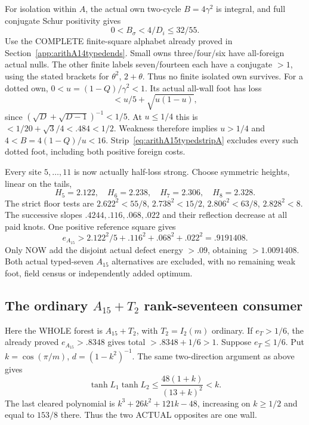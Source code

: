 \documentclass[11pt]{article}
\begin{document}
For isolation within \(A\), the actual
own two-cycle \(B=4\gamma^2\) is integral,
and full conjugate Schur positivity gives
\[
                         0<B_\sigma<4/D_i\le32/55 .
\]
Use the COMPLETE finite-square alphabet
already proved in
Section~\ref{app:arithA14typedends}.
Small owns three/four/six have all-foreign
actual nulls.
The other finite labels seven/fourteen
each have a conjugate \(>1\), using
the stated brackets for \(\theta^2\),
\(2+\theta\).
Thus no finite isolated own survives.
For a dotted own, \(0<u=(1-Q)/\gamma^2<1\).
Its actual all-wall foot has loss
\[
                  <u/5+\sqrt{u(1-u)},
\]
since \((\sqrt D+\sqrt{D-1})^{-1}<1/5\).
At \(u\le1/4\) this is
\(<1/20+\sqrt3/4<.484<1/2\).
Weakness therefore implies \(u>1/4\)
and \(4<B=4(1-Q)/u<16\).
Strip~\eqref{eq:arithA15typedstripA}
excludes every such dotted foot, including
both positive foreign costs.

Every site \(5,\ldots,11\) is now actually
half-loss strong.
Choose symmetric heights, linear on the tails,
\[
           H_5=2.122,\quad H_6=2.238,\quad
           H_7=2.306,\quad H_8=2.328 .
\]
The strict floor tests are
\(2.622^2<55/8\), \(2.738^2<15/2\),
\(2.806^2<63/8\), \(2.828^2<8\).
The successive slopes
\(.4244,.116,.068,.022\) and their
reflection decrease at all paid knots.
One positive reference square gives
\[
        e_{A_{15}}>2.122^2/5+.116^2+.068^2+.022^2=.9191408 .
\]
Only NOW add the disjoint actual defect
energy \(>.09\), obtaining \(>1.0091408\).
Both actual typed-seven \(A_{15}\) alternatives
are excluded, with no remaining weak foot,
field census or independently added optimum.

\subsection[The ordinary A15+T2 rank-seventeen consumer]{The ordinary \(A_{15}+T_2\) rank-seventeen consumer}
\label{app:arithA15ordinary}

Here the WHOLE forest is \(A_{15}+T_2\),
with \(T_2=I_2(m)\) ordinary.
If \(e_T>1/6\), the already proved
\(e_{A_{15}}>.8348\) gives total
\(>.8348+1/6>1\).
Suppose \(e_T\le1/6\).
Put \(k=\cos(\pi/m)\), \(d=(1-k^2)^{-1}\).
The same two-direction argument as above gives
\[
               \tanh L_1\tanh L_2
                  \le{\frac{48(1+k)}{(13+k)^2}}<k .
\]
The last cleared polynomial is
\(k^3+26k^2+121k-48\), increasing on
\(k\ge1/2\) and equal to \(153/8\) there.
Thus the two ACTUAL opposites are one wall.
\end{document}
